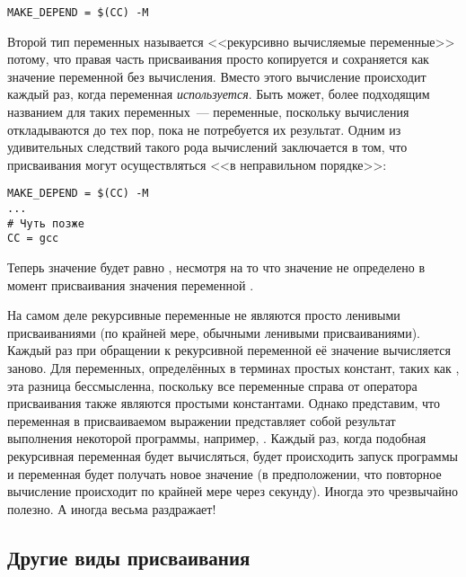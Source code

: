{\footnotesize
\begin{verbatim}
MAKE_DEPEND = $(CC) -M
\end{verbatim}
}

Второй тип переменных называется <<рекурсивно вычисляемые переменные>>
потому, что правая часть присваивания просто копируется \GNUmake{} и
сохраняется как значение переменной без вычисления. Вместо этого
вычисление происходит каждый раз, когда переменная
\emph{используется}. Быть может, более подходящим названием для таких
переменных~---  переменные, поскольку
вычисления откладываются до тех пор, пока не потребуется их результат.
Одним из удивительных следствий такого рода вычислений заключается в
том, что присваивания могут осуществляться <<в неправильном порядке>>:

{\footnotesize
\begin{verbatim}
MAKE_DEPEND = $(CC) -M
...
# Чуть позже
CC = gcc
\end{verbatim}
}

Теперь значение  будет равно ,
несмотря на то что значение  не определено в момент
присваивания значения переменной .

На самом деле рекурсивные переменные не являются просто ленивыми
присваиваниями (по крайней мере, обычными ленивыми присваиваниями).
Каждый раз при обращении к рекурсивной переменной её значение
вычисляется заново. Для переменных, определённых в терминах простых
констант, таких как , эта разница бессмысленна,
поскольку все переменные справа от оператора присваивания также
являются простыми константами. Однако представим, что переменная в
присваиваемом выражении представляет собой результат выполнения
некоторой программы, например, .  Каждый раз, когда
подобная рекурсивная переменная будет вычисляться, будет происходить
запуск программы  и переменная будет получать новое
значение (в предположении, что повторное вычисление происходит по
крайней мере через секунду). Иногда это чрезвычайно полезно. А
иногда весьма раздражает!

\subsection*{Другие виды присваивания}
\label{sec:other_types_of_assign}

